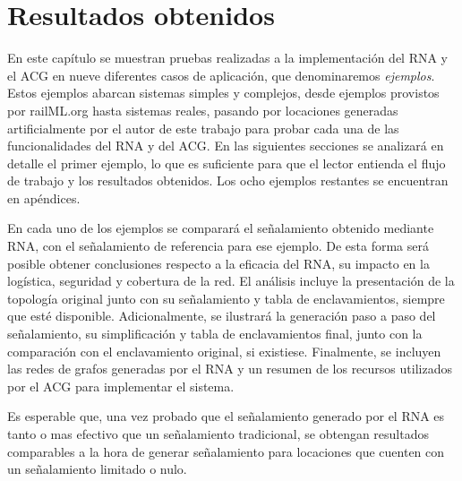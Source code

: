 \chapter{Resultados obtenidos}
	\label{sec:resultados}

	En este capítulo se muestran pruebas realizadas a la implementación del RNA y el ACG en nueve diferentes casos de aplicación, que denominaremos \textit{ejemplos}. Estos ejemplos abarcan sistemas simples y complejos, desde ejemplos provistos por railML.org hasta sistemas reales, pasando por locaciones generadas artificialmente por el autor de este trabajo para probar cada una de las funcionalidades del RNA y del ACG. En las siguientes secciones se analizará en detalle el primer ejemplo, lo que es suficiente para que el lector entienda el flujo de trabajo y los resultados obtenidos. Los ocho ejemplos restantes se encuentran en apéndices.
	
	En cada uno de los ejemplos se comparará el señalamiento obtenido mediante RNA, con el señalamiento de referencia para ese ejemplo. De esta forma será posible obtener conclusiones respecto a la eficacia del RNA, su impacto en la logística, seguridad y cobertura de la red. El análisis incluye la presentación de la topología original junto con su señalamiento y tabla de enclavamientos, siempre que esté disponible. Adicionalmente, se ilustrará la generación paso a paso del señalamiento, su simplificación y tabla de enclavamientos final, junto con la comparación con el enclavamiento original, si existiese. Finalmente, se incluyen las redes de grafos generadas por el RNA y un resumen de los recursos utilizados por el ACG para implementar el sistema.
	
	
	Es esperable que, una vez probado que el señalamiento generado por el RNA es tanto o mas efectivo que un señalamiento tradicional, se obtengan resultados comparables a la hora de generar señalamiento para locaciones que cuenten con un señalamiento limitado o nulo.	
	
	
	
	
	
